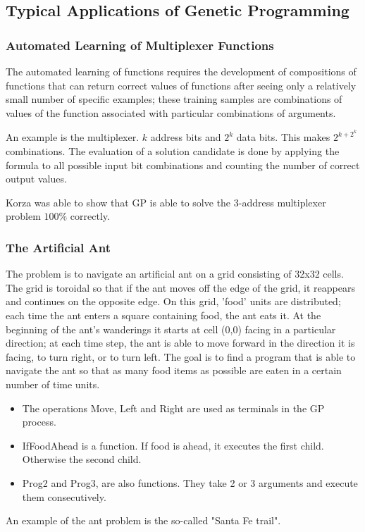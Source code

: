 \documentclass[12pt]{article}
\begin{document}
\subsection{Typical Applications of Genetic Programming}
\subsubsection{Automated Learning of Multiplexer Functions}
The automated learning of functions requires the development of compositions of functions that can return correct values of functions after seeing only a relatively small number of specific examples; these training samples are combinations of values of the function associated with particular combinations of arguments.

An example is the multiplexer. $k$ address bits and $2^k$ data bits. This makes $2^{k+2^k}$ combinations. The evaluation of a solution candidate is done by applying the formula to all possible input bit combinations and counting the number of correct output values.

Korza was able to show that GP is able to solve the 3-address multiplexer problem $100\%$ correctly.

\subsubsection{The Artificial Ant}
The problem is to navigate an artificial ant on a grid consisting of 32x32 cells. The grid is toroidal so that if the ant moves off the edge of the grid, it reappears and continues on the opposite edge. On this grid, 'food' units are distributed; each time the ant enters a square containing food, the ant eats it. At the beginning of the ant's wanderings it starts at cell (0,0) facing in a particular direction; at each time step, the ant is able to move forward in the direction it is facing, to turn right, or to turn left. The goal is to find a program that is able to navigate the ant so that as many food items as possible are eaten in a certain number of time units.
\begin{itemize}
\item The operations Move, Left and Right are used as terminals in the GP process.
\item IfFoodAhead is a function. If food is ahead, it executes the first child. Otherwise the second child.
\item Prog2 and Prog3, are also functions. They take 2 or 3 arguments and execute them consecutively.
\end{itemize}
An example of the ant problem is the so-called "Santa Fe trail".
\end{document}
